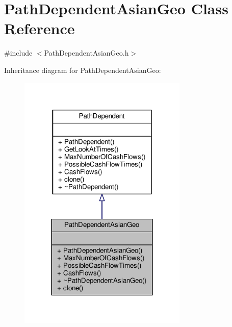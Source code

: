 \hypertarget{classPathDependentAsianGeo}{}\section{Path\+Dependent\+Asian\+Geo Class Reference}
\label{classPathDependentAsianGeo}


{\ttfamily \#include $<$Path\+Dependent\+Asian\+Geo.\+h$>$}



Inheritance diagram for Path\+Dependent\+Asian\+Geo\+:
\nopagebreak
\begin{figure}[H]
\begin{center}
\leavevmode
\includegraphics[width=228pt]{classPathDependentAsianGeo__inherit__graph}
\end{center}
\end{figure}



